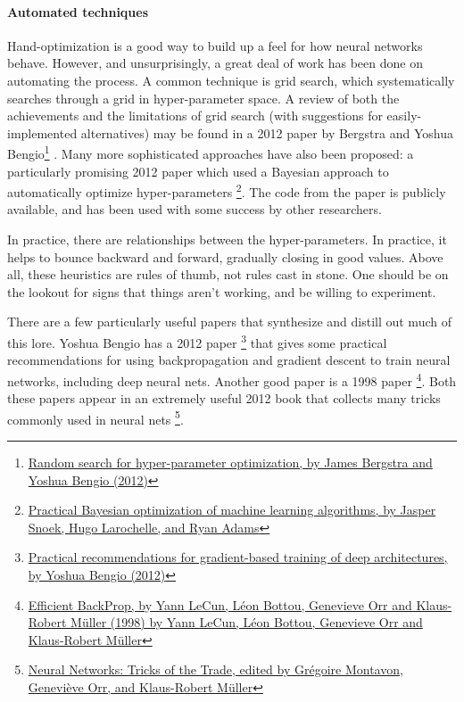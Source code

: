 \documentclass[12pt, letterpaper]{article}
\theoremstyle{definition}
\let\tb\textbf
\begin{document}
\paragraph{\tb{Automated techniques}} Hand-optimization is a good way to build up a feel for how neural networks behave. However, and unsurprisingly, a great deal of work has been done on automating the process. A common technique is grid search, which systematically searches through a grid in hyper-parameter space. A review of both the achievements and the limitations of grid search (with suggestions for easily-implemented alternatives) may be found in a 2012 paper by Bergstra and Yoshua Bengio\footnote{\href{https://dl.acm.org/doi/10.5555/2503308.2188395}{Random search for hyper-parameter optimization, by James Bergstra and Yoshua Bengio (2012)}} . Many more sophisticated approaches have also been proposed: a particularly promising 2012 paper which used a Bayesian approach to automatically optimize hyper-parameters \footnote{\href{http://papers.nips.cc/paper/4522-practical-bayesian-optimization-of-machine-learning-algorithms.pdf}{Practical Bayesian optimization of machine learning algorithms, by Jasper Snoek, Hugo Larochelle, and Ryan Adams}}. The code from the paper is publicly available, and has been used with some success by other researchers.

In practice, there are relationships between the hyper-parameters. In practice, it helps to bounce backward and forward, gradually closing in good values. Above all, these heuristics are rules of thumb, not rules cast in stone. One should be on the lookout for signs that things aren't working, and be willing to experiment. 

There are a few particularly useful papers that synthesize and distill out much of this lore. Yoshua Bengio has a 2012 paper \footnote{\href{https://arxiv.org/abs/1206.5533}{Practical recommendations for gradient-based training of deep architectures, by Yoshua Bengio (2012)}} that gives some practical recommendations for using backpropagation and gradient descent to train neural networks, including deep neural nets. Another good paper is a 1998 paper \footnote{\href{http://yann.lecun.com/exdb/publis/pdf/lecun-98b.pdf}{Efficient BackProp, by Yann LeCun, Léon Bottou, Genevieve Orr and Klaus-Robert Müller (1998) by Yann LeCun, Léon Bottou, Genevieve Orr and Klaus-Robert Müller}}. Both these papers appear in an extremely useful 2012 book that collects many tricks commonly used in neural nets \footnote{\href{https://www.springer.com/gp/book/9783642352881}{Neural Networks: Tricks of the Trade, edited by Grégoire Montavon, Geneviève Orr, and Klaus-Robert Müller}}.
\end{document}
